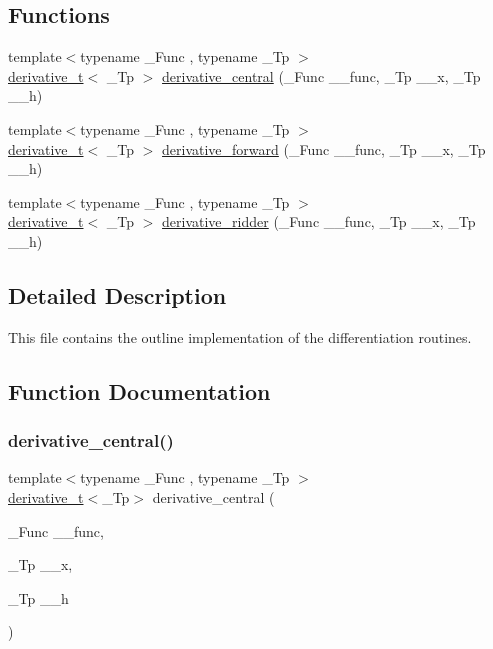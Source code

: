 \subsection*{Functions}
\begin{DoxyCompactItemize}
\item 
{\footnotesize template$<$typename \+\_\+\+Func , typename \+\_\+\+Tp $>$ }\\\hyperlink{structderivative__t}{derivative\+\_\+t}$<$ \+\_\+\+Tp $>$ \hyperlink{derivative_8tcc_aef32000eba6743a6066fdd345ab72f17}{derivative\+\_\+central} (\+\_\+\+Func \+\_\+\+\_\+func, \+\_\+\+Tp \+\_\+\+\_\+x, \+\_\+\+Tp \+\_\+\+\_\+h)
\item 
{\footnotesize template$<$typename \+\_\+\+Func , typename \+\_\+\+Tp $>$ }\\\hyperlink{structderivative__t}{derivative\+\_\+t}$<$ \+\_\+\+Tp $>$ \hyperlink{derivative_8tcc_ac1cc760446a1455c0e97fe098dde2bc7}{derivative\+\_\+forward} (\+\_\+\+Func \+\_\+\+\_\+func, \+\_\+\+Tp \+\_\+\+\_\+x, \+\_\+\+Tp \+\_\+\+\_\+h)
\item 
{\footnotesize template$<$typename \+\_\+\+Func , typename \+\_\+\+Tp $>$ }\\\hyperlink{structderivative__t}{derivative\+\_\+t}$<$ \+\_\+\+Tp $>$ \hyperlink{derivative_8tcc_a3e9da1abac5e2d4a10e0eeca1812590d}{derivative\+\_\+ridder} (\+\_\+\+Func \+\_\+\+\_\+func, \+\_\+\+Tp \+\_\+\+\_\+x, \+\_\+\+Tp \+\_\+\+\_\+h)
\end{DoxyCompactItemize}


\subsection{Detailed Description}
This file contains the outline implementation of the differentiation routines. 

\subsection{Function Documentation}
\mbox{\label{derivative_8tcc_aef32000eba6743a6066fdd345ab72f17}} 
\subsubsection{\texorpdfstring{derivative\+\_\+central()}{derivative\_central()}}
{\footnotesize\ttfamily template$<$typename \+\_\+\+Func , typename \+\_\+\+Tp $>$ \\
\hyperlink{structderivative__t}{derivative\+\_\+t}$<$\+\_\+\+Tp$>$ derivative\+\_\+central (\begin{DoxyParamCaption}\item[{\+\_\+\+Func}]{\+\_\+\+\_\+func,  }\item[{\+\_\+\+Tp}]{\+\_\+\+\_\+x,  }\item[{\+\_\+\+Tp}]{\+\_\+\+\_\+h }\end{DoxyParamCaption})}


